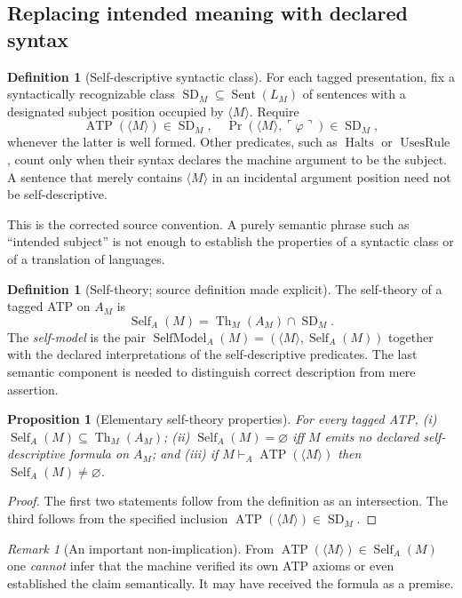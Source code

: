 \documentclass[11pt,letterpaper]{article}
\newtheorem{proposition}[theorem]{Proposition}
\theoremstyle{definition}\newtheorem{definition}[theorem]{Definition}\newtheorem{example}[theorem]{Example}\newtheorem{protocol}[theorem]{Protocol}\newtheorem{question}[theorem]{Open Problem}
\theoremstyle{remark}\newtheorem{remark}[theorem]{Remark}
\newcommand{\Sent}{\operatorname{Sent}}
\newcommand{\Th}{\operatorname{Th}}
\newcommand{\Self}{\operatorname{Self}}
\newcommand{\SD}{\operatorname{SD}}
\newcommand{\Prov}{\operatorname{Pr}}
\newcommand{\Mtag}{\langle M\rangle}
\newcommand{\qname}[1]{\ulcorner #1\urcorner}
\begin{document}
\subsection{Replacing intended meaning with declared syntax}
\begin{definition}[Self-descriptive syntactic class]
For each tagged presentation, fix a syntactically recognizable class $\SD_M\subseteq\Sent(L_M)$ of sentences with a designated subject position occupied by $\Mtag$. Require
\[
\operatorname{ATP}(\Mtag)\in\SD_M,
\quad
\Prov(\Mtag,\qname{\varphi})\in\SD_M,
\]
whenever the latter is well formed. Other predicates, such as $\operatorname{Halts}$ or $\operatorname{UsesRule}$, count only when their syntax declares the machine argument to be the subject. A sentence that merely contains $\Mtag$ in an incidental argument position need not be self-descriptive.
\end{definition}
This is the corrected source convention. A purely semantic phrase such as ``intended subject'' is not enough to establish the properties of a syntactic class or of a translation of languages.
\begin{definition}[Self-theory; source definition made explicit]
The self-theory of a tagged ATP on $A_M$ is
\[
\boxed{\Self_A(M)=\Th_M(A_M)\cap\SD_M.}
\]
The \emph{self-model} is the pair $\operatorname{SelfModel}_A(M)=(\Mtag,\Self_A(M))$ together with the declared interpretations of the self-descriptive predicates. The last semantic component is needed to distinguish correct description from mere assertion.
\end{definition}
\begin{proposition}[Elementary self-theory properties]
For every tagged ATP, (i) $\Self_A(M)\subseteq\Th_M(A_M)$; (ii) $\Self_A(M)=\varnothing$ iff $M$ emits no declared self-descriptive formula on $A_M$; and (iii) if $M\vdash_A\operatorname{ATP}(\Mtag)$ then $\Self_A(M)\ne\varnothing$.
\end{proposition}
\begin{proof}
The first two statements follow from the definition as an intersection. The third follows from the specified inclusion $\operatorname{ATP}(\Mtag)\in\SD_M$.
\end{proof}
\begin{remark}[An important non-implication]
From $\operatorname{ATP}(\Mtag)\in\Self_A(M)$ one \emph{cannot} infer that the machine verified its own ATP axioms or even established the claim semantically. It may have received the formula as a premise.
\end{remark}
\end{document}
